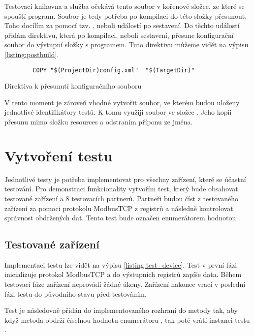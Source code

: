 Testovací knihovna a služba očekává tento soubor v kořenové složce, ze které se spouští program. Soubor je tedy potřeba po kompilaci do této složky přesunout. Toho docílím za pomocí tzv. , neboli událostí po sestavení. Do těchto událostí přidám direktivu, která po kompilaci, neboli sestavení, přesune konfigurační soubor do výstupní složky s programem. Tuto direktivu můžeme vidět na výpisu \ref{listing:postbuild}.

\begin{listing}[htbp]
    \centering
    \begin{verbatim}
        COPY "$(ProjectDir)config.xml"  "$(TargetDir)"
    \end{verbatim}
\caption{Direktiva k přesunutí konfiguračního souboru}
\label{listing:postbuild}
\end{listing}

V tento moment je zároveň vhodné vytvořit soubor, ve kterém budou uloženy jednotlivé identifikátory testů. K tomu využiji soubor  ve složce . Jeho kopii přesunu mimo složku resources a odstraním příponu  ze jména. 

\section{Vytvoření testu}
Jednotlivé testy je potřeba implementovat pro všechny zařízení, které se účastní testování. Pro demonstraci funkcionality vytvořím test, který bude obsahovat testované zařízení a 8 testovacích partnerů. Partneři budou číst z testovaného zařízení za pomoci protokolu ModbusTCP z registrů a následně kontrolovat správnost obdržených dat. Tento test bude označen enumerátorem  hodnotou .


\subsection{Testované zařízení}
Implementaci testu lze vidět na výpisu \ref{listing:test_device}. Test v první fázi inicializuje protokol ModbusTCP a do výstupních registrů zapíše data. Během testovací fáze zařízení neprovádí žádné úkony. Zařízení nakonec vrací v poslední fázi testu do původního stavu před testováním.

Test je následovně přidán do implementovaného rozhraní do metody  tak, aby když metoda obdrží číselnou hodnotu enumerátoru , tak poté vrátí instanci testu . 

